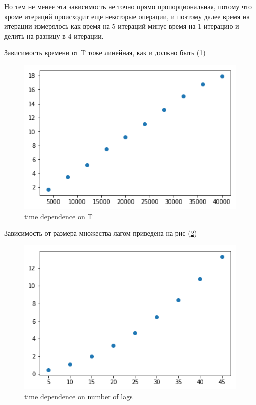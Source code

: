 \documentclass[11pt]{article}
\begin{document}
Но тем не менее эта зависимость не точно прямо пропорциональная, потому что кроме итераций происходит еще некоторые операции, и поэтому далее время на итерации измерялось как время на 5 итераций минус время на 1 итерацию и делить на разницу в 4 итерации.

Зависимость времени от T тоже линейная, как и должно быть (\ref{fig:T_dependence}) 
\begin{figure}[!htb]
\includegraphics[width = 15cm]{T_dependence.png}
\caption{time dependence on T}
\label{fig:T_dependence}
\end{figure} 

Зависимость от размера множества лагом приведена на рис (\ref{fig:lags_size_dependence})
\begin{figure}[!htb]
\includegraphics[width = 15cm]{lags_size_dependence.png}
\caption{time dependence on number of lags}
\label{fig:lags_size_dependence}
\end{figure} 
\end{document}
